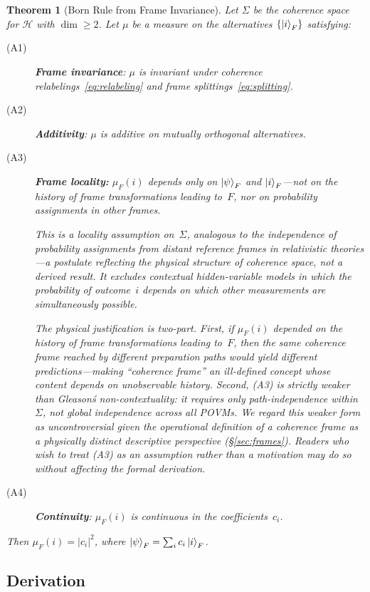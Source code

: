 \documentclass[aps,prd,twocolumn,superscriptaddress,nofootinbib,floatfix]{revtex4-2}
\newtheorem{theorem}{Theorem}
\newcommand{\Sig}{\Sigma}
\begin{document}
\begin{theorem}[Born Rule from Frame Invariance]\label{thm:born}
Let $\Sig$ be the coherence space for $\mathcal{H}$ with $\dim \geq 2$. Let $\mu$ be a measure on the alternatives $\{\ket{i}_F\}$ satisfying:
\begin{description}
\item[(A1)] \textbf{Frame invariance}: $\mu$ is invariant under coherence relabelings~\eqref{eq:relabeling} and frame splittings~\eqref{eq:splitting}.
\item[(A2)] \textbf{Additivity}: $\mu$ is additive on mutually orthogonal alternatives.
\item[(A3)] \textbf{Frame locality:} $\mu_F(i)$ depends only on $\ket{\psi}_F$ and $\ket{i}_F$---not on the history of frame transformations leading to~$F$, nor on probability assignments in other frames.

\smallskip
This is a \emph{locality assumption on~$\Sig$}, analogous to the independence of probability assignments from distant reference frames in relativistic theories---a postulate reflecting the physical structure of coherence space, not a derived result. It excludes contextual hidden-variable models in which the probability of outcome~$i$ depends on which other measurements are simultaneously possible.

The physical justification is two-part. First, if $\mu_F(i)$ depended on the history of frame transformations leading to~$F$, then the same coherence frame reached by different preparation paths would yield different predictions---making ``coherence frame'' an ill-defined concept whose content depends on unobservable history. Second, (A3) is strictly weaker than Gleason\'s non-contextuality: it requires only path-independence within~$\Sig$, not global independence across all POVMs. We regard this weaker form as uncontroversial given the operational definition of a coherence frame as a physically distinct descriptive perspective (§\ref{sec:frames}). Readers who wish to treat (A3) as an assumption rather than a motivation may do so without affecting the formal derivation.
\item[(A4)] \textbf{Continuity}: $\mu_F(i)$ is continuous in the coefficients~$c_i$.
\end{description}
Then $\mu_F(i) = |c_i|^2$, where $\ket{\psi}_F = \sum_i c_i\ket{i}_F$.
\end{theorem}

\subsection{Derivation}
\end{document}
